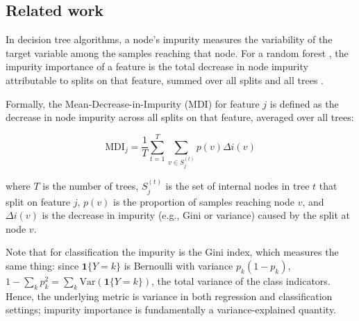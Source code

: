 \subsection{Related work}

In decision tree algorithms, a node's impurity measures the variability
of the target variable among the samples reaching that node.
For a random forest \citep{breiman2001}, the impurity importance of a feature is
the total decrease in node impurity attributable to splits on that feature,
summed over all splits and all trees \citep{breiman1984,louppe2013}.


Formally, the Mean-Decrease-in-Impurity (MDI) for feature $j$ is defined as the
decrease in node impurity across all splits on that feature, averaged over all
trees:

\begin{equation}
\text{MDI}_j = \frac{1}{T}\sum_{t=1}^{T} \sum_{v \in S_j^{(t)}} p(v) \Delta i(v)
\end{equation}

\noindent
where $T$ is the number of trees, $S_j^{(t)}$ is the set of internal nodes in
tree $t$ that split on feature $j$, $p(v)$ is the proportion of samples reaching
node $v$, and $\Delta i(v)$ is the decrease in impurity (e.g., Gini or variance)
caused by the split at node $v$.



Note that
for classification the impurity is the
Gini index, which measures the same thing: since $\mathbf{1}\{Y=k\}$ is
Bernoulli with variance $p_k(1-p_k)$,
$1 - \sum_k p_k^2 = \sum_k \mathrm{Var}(\mathbf{1}\{Y = k\})$, the total
variance
of the class indicators.
Hence, the underlying metric is variance in both regression and classification
settings; impurity importance is fundamentally a variance-explained quantity.


